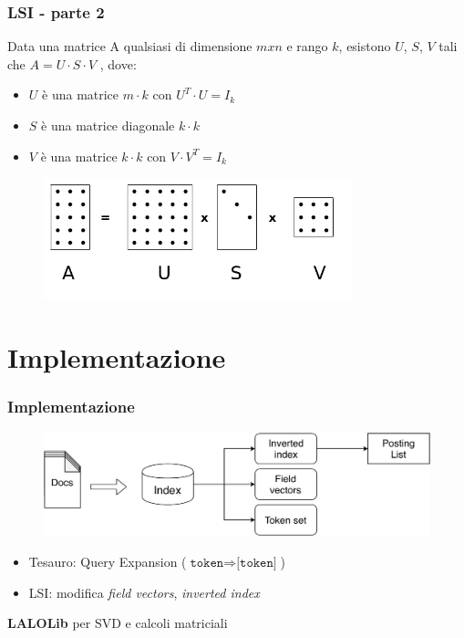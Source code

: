 \documentclass{beamer}
\begin{document}
\begin{frame}
	\frametitle{LSI - parte 2}
	\begin{theorem}
		Data una matrice A qualsiasi di dimensione $m x n$ e rango $k$, esistono $U$, $S$, $V$ tali che $A = U \cdot S \cdot V$ , dove:
		\begin{itemize}
			\item $U$ è una matrice $m \cdot k$ con $U^T \cdot U = I_k$
			\item $S$ è una matrice diagonale $k \cdot k$
			\item $V$ è una matrice $k \cdot k$ con $V \cdot V^T = I_k$
		\end{itemize}
		\end{theorem}
		\begin{figure}
			\centering
			\includegraphics[width=0.8\textwidth]{img/SVD.png}
		\end{figure}
\end{frame}

\section{Implementazione}
\begin{frame}
	\frametitle{Implementazione}
	\begin{figure}
		\centering
		\includegraphics[width=\textwidth]{img/indice.pdf}
	\end{figure}	
	\begin{itemize}
		\item Tesauro: Query Expansion ($\texttt{token} \Rightarrow \texttt{[token]}$)
		\item LSI: modifica \emph{field vectors}, \emph{inverted index}
	\end{itemize}

	\textbf{LALOLib} per SVD e calcoli matriciali
	
	\end{frame}
\end{document}
